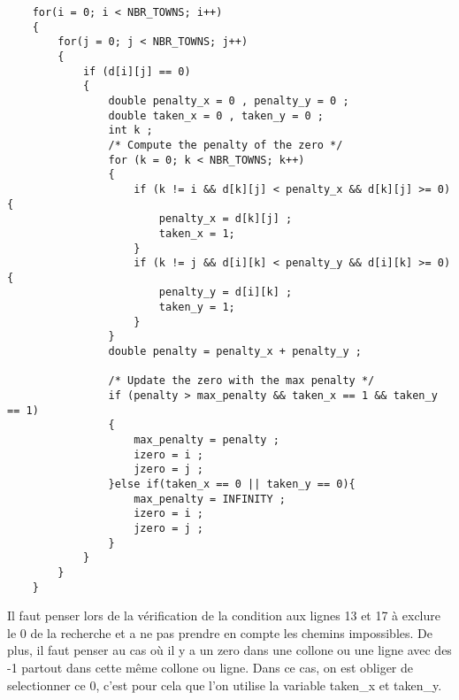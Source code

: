 \documentclass[11pt]{article}
\begin{document}
\begin{lstlisting}
    for(i = 0; i < NBR_TOWNS; i++)
    {
        for(j = 0; j < NBR_TOWNS; j++)
        {
            if (d[i][j] == 0)
            {
                double penalty_x = 0 , penalty_y = 0 ;
                double taken_x = 0 , taken_y = 0 ;
                int k ;
                /* Compute the penalty of the zero */
                for (k = 0; k < NBR_TOWNS; k++)
                {
                    if (k != i && d[k][j] < penalty_x && d[k][j] >= 0){
                        penalty_x = d[k][j] ;
                        taken_x = 1;
                    }
                    if (k != j && d[i][k] < penalty_y && d[i][k] >= 0){
                        penalty_y = d[i][k] ;
                        taken_y = 1;
                    }
                }
                double penalty = penalty_x + penalty_y ;
                
                /* Update the zero with the max penalty */
                if (penalty > max_penalty && taken_x == 1 && taken_y == 1)
                {
                    max_penalty = penalty ;
                    izero = i ;
                    jzero = j ;
                }else if(taken_x == 0 || taken_y == 0){
                    max_penalty = INFINITY ;
                    izero = i ;
                    jzero = j ;
                }
            }
        }
    }
\end{lstlisting}

Il faut penser lors de la vérification de la condition aux lignes 13 et 17 à exclure le 0 de la recherche et a ne pas prendre en compte les chemins impossibles.
De plus, il faut penser au cas où il y a un zero dans une collone ou une ligne avec des -1 partout dans cette même collone ou ligne. Dans ce cas, on est obliger de selectionner ce 0, c'est pour cela que l'on utilise la variable taken\_x et taken\_y.
\end{document}
